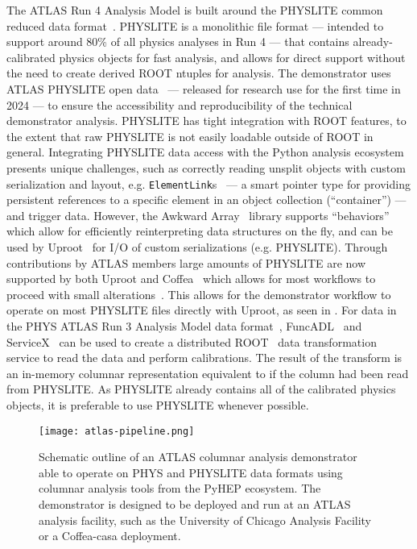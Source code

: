 The ATLAS Run 4 Analysis Model is built around the PHYSLITE common reduced data format~\cite{Schaarschmidt:2024vzr,SOFT-2022-02}.
PHYSLITE is a monolithic file format --- intended to support around 80\% of all physics analyses in Run 4 --- that contains already-calibrated physics objects for fast analysis, and allows for direct support without the need to create derived ROOT ntuples for analysis.
The demonstrator uses ATLAS PHYSLITE open data~\cite{ATL-OREACH-PROC-2024-005} --- released for research use for the first time in 2024 --- to ensure the accessibility and reproducibility of the technical demonstrator analysis.
PHYSLITE has tight integration with ROOT features, to the extent that raw PHYSLITE is not easily loadable outside of ROOT in general.
Integrating PHYSLITE data access with the Python analysis ecosystem presents unique challenges, such as correctly reading unsplit objects with custom serialization and layout, e.g. \texttt{ElementLink}s~\cite{Hartmann:2021qzp} --- a smart pointer type for providing persistent references to a specific element in an object collection (``container'') --- and trigger data.
However, the Awkward Array~\cite{Awkward_Array_2018} library supports ``behaviors'' which allow for efficiently reinterpreting data structures on the fly, and can be used by Uproot~\cite{Uproot_2017} for I/O of custom serializations (e.g. PHYSLITE).
Through contributions by ATLAS members large amounts of PHYSLITE are now supported by both Uproot and Coffea~\cite{Coffea_2023,CMS:2020kpn} which allows for most workflows to proceed with small alterations~\cite{US_ATLAS_IRISHEP_trainging:2024}.
This allows for the demonstrator workflow to operate on most PHYSLITE files directly with Uproot, as seen in .
For data in the PHYS ATLAS Run 3 Analysis Model data format~\cite{SOFT-2022-02}, FuncADL~\cite{funcadl_2024,Proffitt:2021wfh} and ServiceX~\cite{serviceX_2024,serviceX_client_2024,Galewsky:2020xig} can be used to create a distributed ROOT~\cite{Brun:1997pa} data transformation service to read the data and perform calibrations.
The result of the transform is an in-memory columnar representation equivalent to if the column had been read from PHYSLITE.
As PHYSLITE already contains all of the calibrated physics objects, it is preferable to use PHYSLITE whenever possible.

\begin{figure}
    \centering
    \texttt{[image: atlas-pipeline.png]}
    \caption{Schematic outline of an ATLAS columnar analysis demonstrator able to operate on PHYS and PHYSLITE data formats using columnar analysis tools from the PyHEP ecosystem.
    The demonstrator is designed to be deployed and run at an ATLAS analysis facility, such as the University of Chicago Analysis Facility or a Coffea-casa deployment.}
    \label{fig:atlas-pipeline}
\end{figure}
